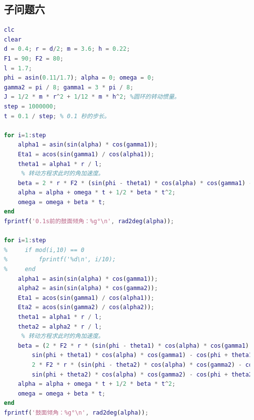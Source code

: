 \documentclass{cumcm}
\begin{document}
\subsection{子问题六}
\begin{lstlisting}[language=matlab]
clc
clear
d = 0.4; r = d/2; m = 3.6; h = 0.22;
F1 = 90; F2 = 80;
l = 1.7;
phi = asin(0.11/1.7); alpha = 0; omega = 0;
gamma2 = pi / 8; gamma1 = 3 * pi / 8;
J = 1/2 * m * r^2 + 1/12 * m * h^2; %圆环的转动惯量。
step = 1000000;
t = 0.1 / step; % 0.1 秒的步长。

for i=1:step
    alpha1 = asin(sin(alpha) * cos(gamma1));
    Eta1 = acos(sin(gamma1) / cos(alpha1));
    theta1 = alpha1 * r / l;
     % 转动方程求此时的角加速度。
    beta = 2 * r * F2 * (sin(phi - theta1) * cos(alpha) * cos(gamma1) - cos(phi - theta1) * sin(alpha1) * sin(Eta1)) / J;
    alpha = alpha + omega * t + 1/2 * beta * t^2;
    omega = omega + beta * t;
end
fprintf('0.1s前的鼓面倾角：%g°\n', rad2deg(alpha));

for i=1:step
%     if mod(i,10) == 0
%         fprintf('%d\n', i/10);
%     end
    alpha1 = asin(sin(alpha) * cos(gamma1));
    alpha2 = asin(sin(alpha) * cos(gamma2));
    Eta1 = acos(sin(gamma1) / cos(alpha1));
    Eta2 = acos(sin(gamma2) / cos(alpha2));
    theta1 = alpha1 * r / l;
    theta2 = alpha2 * r / l;
     % 转动方程求此时的角加速度。
    beta = (2 * F2 * r * (sin(phi - theta1) * cos(alpha) * cos(gamma1) - cos(phi - theta1) * sin(alpha1) * sin(Eta1) - ...
        sin(phi + theta1) * cos(alpha) * cos(gamma1) - cos(phi + theta1) * sin(alpha1) * sin(Eta1)) + ...
        2 * F2 * r * (sin(phi - theta2) * cos(alpha) * cos(gamma2) - cos(phi - theta2) * sin(alpha2) * sin(Eta2) - ...
        sin(phi + theta2) * cos(alpha) * cos(gamma2) - cos(phi + theta2) * sin(alpha2) * sin(Eta2))) / J;
    alpha = alpha + omega * t + 1/2 * beta * t^2;
    omega = omega + beta * t;
end
fprintf('鼓面倾角：%g°\n', rad2deg(alpha));
\end{lstlisting}
\end{document}
